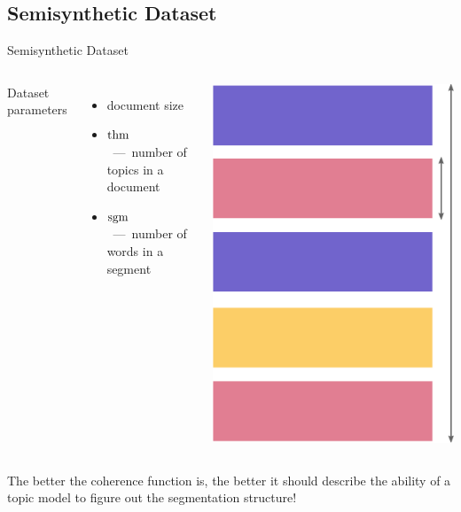 \documentclass[russian]{beamer}
\begin{document}
\subsection{Semisynthetic Dataset}

\begin{frame}{Semisynthetic Dataset}
  \begin{columns}
    Dataset parameters
    \vspace{0.25cm}
    
    \begin{itemize}\setlength{\leftmargin}{0pt}
    \item
      document size
    \item
      $\operatorname{thm}$~---~number of topics in a document
    \item
      $\operatorname{sgm}$~---~number of words in a segment
    \end{itemize}
    \includegraphics[scale=0.20]{dataset}
  \end{columns}
  
  \begin{block}{}
    The better the coherence function is, the better it should describe the ability of a topic model to figure out the segmentation structure!
  \end{block}
\end{frame}
\end{document}
